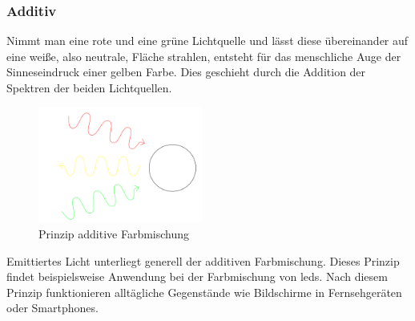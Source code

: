 \documentclass[11pt]{scrartcl}
\begin{document}
\subsubsection{Additiv}
Nimmt man eine rote und eine grüne Lichtquelle und lässt diese übereinander auf eine weiße, also neutrale, Fläche strahlen, entsteht für
das menschliche Auge der Sinneseindruck einer gelben Farbe. Dies geschieht durch die Addition der Spektren der beiden Lichtquellen.
\cite[62]{lichtquellen}\\
\begin{figure}
    \vspace{-25pt}
    \begin{center}
        \includegraphics[width=0.48\textwidth]{images/additive_color_mixing.png}
    \end{center}
    \vspace{-20pt}
    \caption{Prinzip additive Farbmischung}
    \vspace{-15pt}
\end{figure}
Emittiertes Licht unterliegt generell der additiven Farbmischung. Dieses Prinzip findet beispielsweise Anwendung bei der Farbmischung von
\ac{led}s. Nach diesem Prinzip funktionieren alltägliche Gegenstände wie Bildschirme in Fernsehgeräten oder Smartphones.
\end{document}
